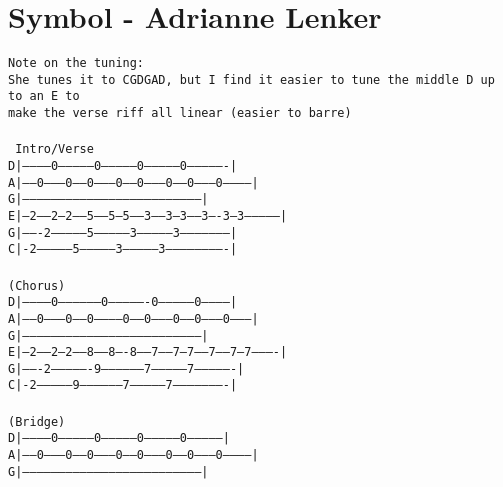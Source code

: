 \newpage
\section{Symbol - Adrianne Lenker}
\label{Symbol - Adrianne Lenker}
\texttt{Note on the tuning:\\
She tunes it to CGDGAD, but I find it easier to tune the middle D up to an E to\\
make the verse riff all linear (easier to barre)\\
\\
\lbrack\ Intro/Verse\rbrack\\
D|-----------0---------------0---------------0--------------0----------------|\\
A|-----0---------0-----0---------0-----0---------0-----0--------0------------|\\
G|---------------------------------------------------------------------------|\\
E|---2-----2---2-----5-----5---5-----3-----3---3-----3----3---3--------------|\\
G|-------2---------------5---------------3--------------3--------------------|\\
C|-2---------------5---------------3---------------3-------------------------|\\
\\
(Chorus)\\
D|-----------0-----------------0----------------0---------------0------------|\\
A|-----0---------0------0-----------0-----0---------0-----0---------0--------|\\
G|---------------------------------------------------------------------------|\\
E|---2-----2---2-----8------8----8------7-----7---7-----7-----7---7----------|\\
G|-------2----------------9-----------------7---------------7----------------|\\
C|-2---------------9------------------7---------------7----------------------|\\
\\
(Bridge)\\
D|-----------0---------------0---------------0---------------0---------------|\\
A|-----0---------0-----0---------0-----0---------0-----0---------0-----------|\\
G|---------------------------------------------------------------------------|\\
}

